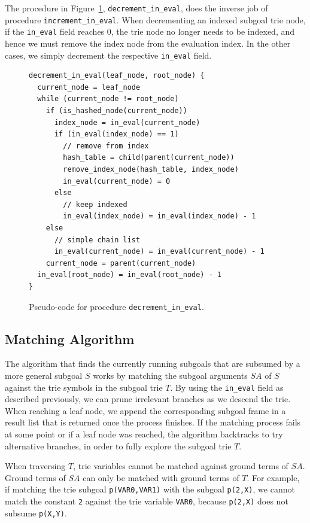 The procedure in Figure~\ref{fig:decrement_in_eval},
\texttt{decrement\_in\_eval}, does the inverse job of procedure
\texttt{increment\_in\_eval}. When decrementing an indexed subgoal trie
node, if the \texttt{in\_eval} field reaches 0, the trie node no longer needs
to be indexed, and hence we must remove the index node from the
evaluation index. In the other cases, we simply decrement the
respective \texttt{in\_eval} field.

\begin{figure}[ht]
\begin{Verbatim}
decrement_in_eval(leaf_node, root_node) {
  current_node = leaf_node
  while (current_node != root_node)
    if (is_hashed_node(current_node))
      index_node = in_eval(current_node)
      if (in_eval(index_node) == 1)
        // remove from index
        hash_table = child(parent(current_node))
        remove_index_node(hash_table, index_node)
        in_eval(current_node) = 0
      else
        // keep indexed
        in_eval(index_node) = in_eval(index_node) - 1
    else
      // simple chain list
      in_eval(current_node) = in_eval(current_node) - 1
    current_node = parent(current_node)
  in_eval(root_node) = in_eval(root_node) - 1
}
\end{Verbatim}
\caption{Pseudo-code for procedure \texttt{decrement\_in\_eval}.}
\label{fig:decrement_in_eval}
\end{figure}

\subsection{Matching Algorithm}

The algorithm that finds the currently running subgoals that are
subsumed by a more general subgoal $S$ works by matching the subgoal
arguments $SA$ of $S$ against the trie symbols in the subgoal trie
$T$. By using the \texttt{in\_eval} field as described previously, we can
prune irrelevant branches as we descend the trie. When reaching a leaf
node, we append the corresponding subgoal frame in a result list that
is returned once the process finishes. If the matching process fails
at some point or if a leaf node was reached, the algorithm backtracks
to try alternative branches, in order to fully explore the subgoal
trie $T$.

When traversing $T$, trie variables cannot be matched against ground
terms of $SA$. Ground terms of $SA$ can only be matched with ground
terms of $T$. For example, if matching the trie subgoal
\texttt{p(VAR0,VAR1)} with the subgoal \texttt{p(2,X)}, we cannot match the
constant \texttt{2} against the trie variable \texttt{VAR0}, because \texttt{p(2,X)} does
not subsume \texttt{p(X,Y)}.

